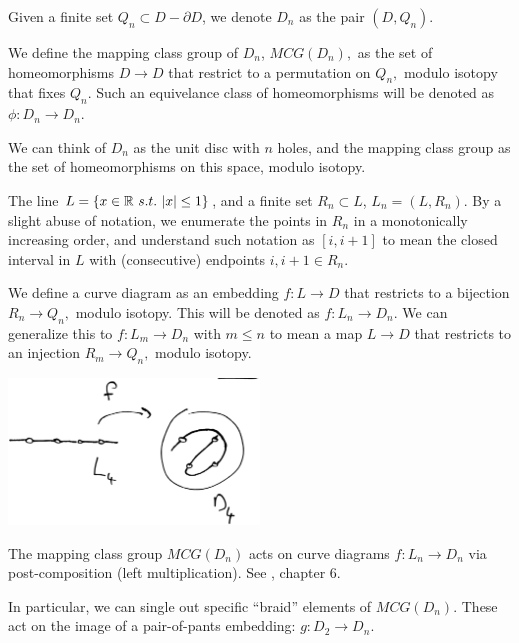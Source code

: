 \documentclass[12pt,a4paper]{article}
\begin{document}
Given a finite set $ Q_n \subset D-\partial D$,
we denote $D_n$ as the pair $(D, Q_n).$

We define the mapping class group of $D_n$,
$MCG(D_n),$ as the set of homeomorphisms $D\to D$ that
restrict to a permutation on $Q_n,$ modulo isotopy that
fixes $Q_n.$
Such an equivelance class
of homeomorphisms will be denoted as $\phi:D_n\to D_n.$

We can think of $D_n$ as the unit disc with $n$ holes,
and the mapping class group as the set of homeomorphisms on
this space, modulo isotopy.

The line $L = \{ x\in \mathbb{R}\ s.t.\ |x|\leq 1 \} $,
and a finite set $R_n\subset L$,
$L_n = (L, R_n).$
By a slight abuse of notation, we enumerate the points in $R_n$ 
in a monotonically increasing order,
and understand such notation as $[i, i+1]$ to mean the closed interval in $L$
with (consecutive) endpoints $i, i+1 \in R_n.$

We define a curve diagram as an embedding $f : L\to D$ that
restricts to a bijection $R_n\to Q_n,$ modulo
isotopy.
This will be denoted as $f : L_n\to D_n.$
We can generalize this to $f : L_m\to D_n$ with $m\leq n$
to mean a map $L\to D$ that restricts to an injection $R_m\to Q_n,$
modulo isotopy.

\begin{center}
\includegraphics[width=0.5\textwidth]{curve-diagram.eps}
\end{center}




The mapping class group $MCG(D_n)$ acts on curve diagrams $f : L_n\to D_n$
via post-composition (left multiplication). See \cite{Dehornoy02}, chapter 6.


In particular, we can single out specific ``braid'' elements of $MCG(D_n)$.
These act on the image of a pair-of-pants embedding: $g:D_2\to D_n.$
\end{document}
